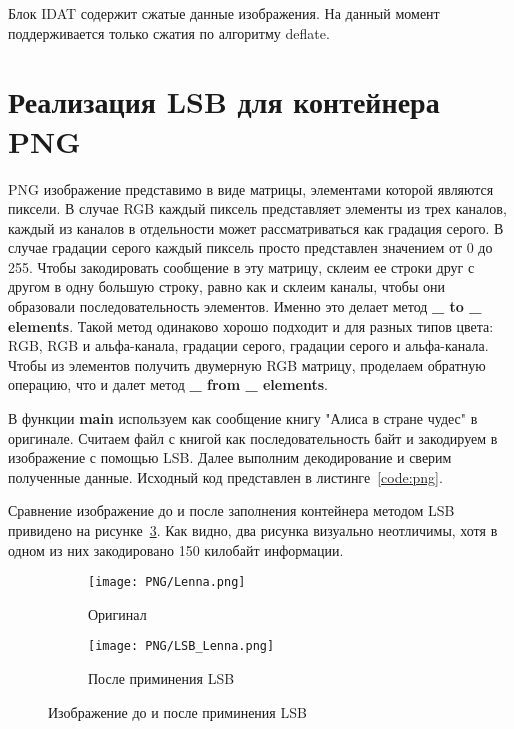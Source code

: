 Блок IDAT содержит сжатые данные изображения.
На данный момент поддерживается только сжатия по алгоритму deflate.

\section{Реализация LSB для контейнера PNG}
PNG изображение представимо в виде матрицы, элементами которой являются пиксели.
В случае RGB каждый пиксель представляет элементы из трех каналов, каждый из каналов
в отдельности может рассматриваться как градация серого. В случае градации серого каждый
пиксель просто представлен значением от 0 до 255.
Чтобы закодировать сообщение в эту матрицу, склеим ее строки друг с другом в одну большую строку,
равно как и склеим каналы, чтобы они образовали последовательность элементов.
Именно это делает метод \textbf{\_ to \_ elements}.
Такой метод одинаково хорошо подходит и для разных типов цвета: RGB, RGB и альфа-канала,
градации серого, градации серого и альфа-канала.
Чтобы из элементов получить двумерную RGB матрицу,
проделаем обратную операцию, что и далет метод \textbf{\_ from \_ elements}.

В функции \textbf{main} используем как сообщение книгу "Алиса в стране чудес" в оригинале.
Считаем файл с книгой как последовательность байт и закодируем в изображение с помощью LSB.
Далее выполним декодирование и сверим полученные данные.
Исходный код представлен в листинге~\ref{code:png}.

Сравнение изображение до и после заполнения контейнера методом LSB
привидено на рисунке~\ref{img:lsb}.
Как видно, два рисунка визуально неотличимы,
хотя в одном из них закодировано 150 килобайт информации.
\begin{figure}[ht!]
    \centering
    \begin{subfigure}{.5\textwidth}
      \centering
      \texttt{[image: PNG/Lenna.png]}
      \caption{Оригинал}
      \label{img:lenna-png}
    \end{subfigure}%
    \begin{subfigure}{.5\textwidth}
      \centering
      \texttt{[image: PNG/LSB\_Lenna.png]}
      \caption{После приминения LSB}
      \label{img:lenna-lsb}
    \end{subfigure}
    \caption{Изображение до и после приминения LSB}
    \label{img:lsb}
\end{figure}